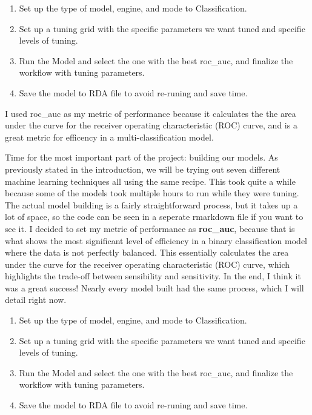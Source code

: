 \documentclass[
]{article}
\providecommand{\tightlist}{%
  \setlength{\itemsep}{0pt}\setlength{\parskip}{0pt}}
\begin{document}
\begin{enumerate}
\def\labelenumi{\arabic{enumi}.}
\tightlist
\item
  Set up the type of model, engine, and mode to Classification.
\item
  Set up a tuning grid with the specific parameters we want tuned and
  specific levels of tuning.
\item
  Run the Model and select the one with the best roc\_auc, and finalize
  the workflow with tuning parameters.
\item
  Save the model to RDA file to avoid re-runing and save time.
\end{enumerate}

I used roc\_auc as my metric of performance because it calculates the
the area under the curve for the receiver operating characteristic (ROC)
curve, and is a great metric for efficency in a multi-classification
model.

Time for the most important part of the project: building our models. As
previously stated in the introduction, we will be trying out seven
different machine learning techniques all using the same recipe. This
took quite a while because some of the models took multiple hours to run
while they were tuning. The actual model building is a fairly
straightforward process, but it takes up a lot of space, so the code can
be seen in a seperate rmarkdown file if you want to see it. I decided to
set my metric of performance as \textbf{roc\_auc}, because that is what
shows the most significant level of efficiency in a binary
classification model where the data is not perfectly balanced. This
essentially calculates the area under the curve for the receiver
operating characteristic (ROC) curve, which highlights the trade-off
between sensibility and sensitivity. In the end, I think it was a great
success! Nearly every model built had the same process, which I will
detail right now.

\begin{enumerate}
\def\labelenumi{\arabic{enumi}.}
\tightlist
\item
  Set up the type of model, engine, and mode to Classification.
\item
  Set up a tuning grid with the specific parameters we want tuned and
  specific levels of tuning.
\item
  Run the Model and select the one with the best roc\_auc, and finalize
  the workflow with tuning parameters.
\item
  Save the model to RDA file to avoid re-runing and save time.
\end{enumerate}
\end{document}
